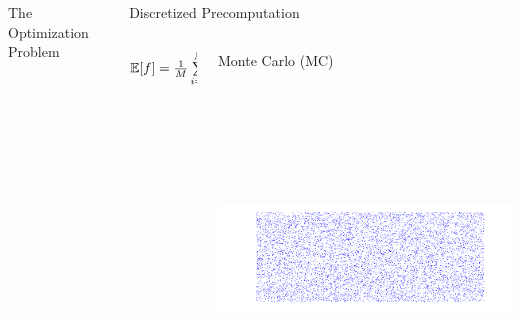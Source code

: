 \documentclass[final]{beamer}
\newcommand{\E}{\ensuremath{\mathbb{E}} } %
\newcommand {\bxi} {\mbox{\boldmath $\xi$}}%
\begin{document}
\begin{frame}{}
{\begin{columns}[t]
\begin{column}{.30\linewidth}
\begin{block}{\centering The Optimization Problem}
\end{block}


                        

 \end{column}
                        
        
        
\begin{column}{.30\linewidth}

\begin{block}{\centering Discretized Precomputation}

\begin{columns}[T]

\begin{column}{10cm}{}
\centering
\vspace{3cm}
$\E[f] = \frac{1}{M}  \sum\limits_{i=1}^M f(\bxi_i)$
\end{column}

\begin{column}{12cm}{\centering \scriptsize{Monte Carlo (MC)}}
\centering\includegraphics[height=10cm, width = 10cm]{figures/MCpoints}
\end{column}


\end{columns}
\end{block}
\end{column}
\end{columns}}
\end{frame}
\end{document}
